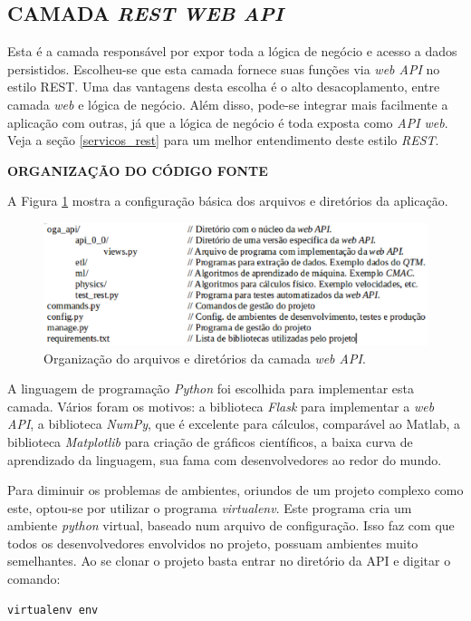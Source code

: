 \subsection{CAMADA \emph{REST WEB API}}

Esta é a camada responsável por expor toda a lógica de negócio e acesso a dados persistidos. Escolheu-se que esta camada fornece suas funções via \emph{web API} no estilo REST.
Uma das vantagens desta escolha é o alto desacoplamento, entre camada \emph{web} e lógica de negócio. 
Além disso, pode-se integrar mais facilmente a aplicação com outras, já que a lógica de negócio é toda exposta como \emph{API web}. 
Veja a seção \ref{servicos_rest} para um melhor entendimento deste estilo \emph{REST}.

\textbf{ORGANIZAÇÃO DO CÓDIGO FONTE}

\noindent
A Figura \ref{dir_api} mostra a configuração básica dos arquivos e diretórios da aplicação.

\begin{figure}[ht]
	\centering
	\includegraphics[width=15cm]{figuras/dir_api.eps}
	\caption{Organização do arquivos e diretórios da camada \emph{web API}.}
	\label{dir_api}
\end{figure}

A linguagem de programação \emph{Python} foi escolhida para implementar esta camada. Vários foram os motivos: a biblioteca \emph{Flask} para implementar a \emph{web API}, a biblioteca \emph{NumPy}, que é excelente para cálculos, comparável ao Matlab, a biblioteca \emph{Matplotlib} para criação de gráficos científicos, a baixa curva de aprendizado da linguagem, sua fama com desenvolvedores ao redor do mundo.

Para diminuir os problemas de ambientes, oriundos de um projeto complexo como este, optou-se por utilizar o programa \emph{virtualenv}. Este programa cria um ambiente \emph{python} virtual, baseado num arquivo de configuração. Isso faz com que todos os desenvolvedores envolvidos no projeto, possuam ambientes muito semelhantes.
Ao se clonar o projeto basta entrar no diretório da API e digitar o comando:
\lstset{language=bash}
\begin{lstlisting}[frame=single]
virtualenv env
\end{lstlisting}

